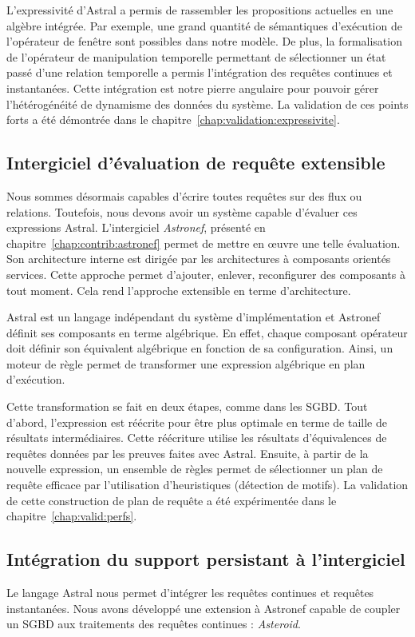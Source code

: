 L'expressivité d'Astral a permis de rassembler les propositions actuelles en une algèbre intégrée. Par exemple, une grand quantité de sémantiques d'exécution de l'opérateur de fenêtre sont possibles dans notre modèle. De plus, la formalisation de l'opérateur de manipulation temporelle permettant de sélectionner un état passé d'une relation temporelle a permis l'intégration des requêtes continues et instantanées. Cette intégration est notre pierre angulaire pour pouvoir gérer l'hétérogénéité de dynamisme des données du système. La validation de ces points forts a été démontrée dans le chapitre~\ref{chap:validation:expressivite}.

\subsection{Intergiciel d'évaluation de requête extensible}
Nous sommes désormais capables d'écrire toutes requêtes sur des flux ou relations. Toutefois, nous devons avoir un système capable d'évaluer ces expressions Astral. L'intergiciel \textit{Astronef}, présenté en chapitre~\ref{chap:contrib:astronef} permet de mettre en œuvre une telle évaluation. Son architecture interne est dirigée par les architectures à composants orientés services. Cette approche permet d'ajouter, enlever, reconfigurer des composants à tout moment. Cela rend l'approche extensible en terme d'architecture.

Astral est un langage indépendant du système d'implémentation et Astronef définit ses composants en terme algébrique. En effet, chaque composant opérateur doit définir son équivalent algébrique en fonction de sa configuration. Ainsi, un moteur de règle permet de transformer une expression algébrique en plan d'exécution.

Cette transformation se fait en deux étapes, comme dans les SGBD. Tout d'abord, l'expression est réécrite pour être plus optimale en terme de taille de résultats intermédiaires. Cette réécriture utilise les résultats d'équivalences de requêtes données par les preuves faites avec Astral. Ensuite, à partir de la nouvelle expression, un ensemble de règles permet de sélectionner un plan de requête efficace par l'utilisation d'heuristiques (détection de motifs). La validation de cette construction de plan de requête a été expérimentée dans le chapitre~\ref{chap:valid:perfs}. 

\subsection{Intégration du support persistant à l'intergiciel}
Le langage Astral nous permet d'intégrer les requêtes continues et requêtes instantanées. Nous avons développé une extension à Astronef capable de coupler un SGBD aux traitements des requêtes continues : \textit{Asteroid}.

